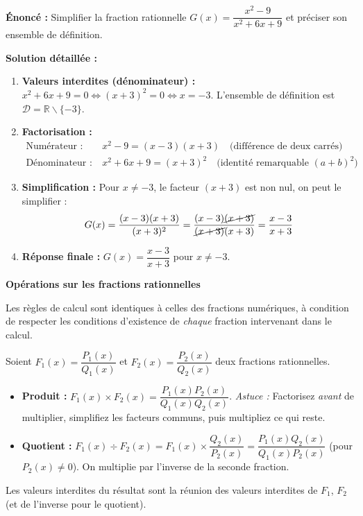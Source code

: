 \documentclass[11pt]{article}
\def\setminus{\mathbin{\backslash}}\let\smallsetminus\setminus
\begin{document}
\begin{exoresolu}
\textbf{Énoncé :} Simplifier la fraction rationnelle $G(x) = \dfrac{x^2 - 9}{x^2 + 6x + 9}$ et préciser son ensemble de définition.

\textbf{Solution détaillée :}
\begin{enumerate}
\item \textbf{Valeurs interdites (dénominateur) :} $x^2 + 6x + 9 = 0 \iff (x+3)^2 = 0 \iff x = -3$.
   L'ensemble de définition est $\mathcal{D} = \mathbb{R} \setminus \{-3\}$.
\item \textbf{Factorisation :}
   \begin{align*}
   \text{Numérateur : } & x^2 - 9 = (x-3)(x+3) \quad \text{(différence de deux carrés)} \\
   \text{Dénominateur : } & x^2 + 6x + 9 = (x+3)^2 \quad \text{(identité remarquable $(a+b)^2$)}
   \end{align*}
\item \textbf{Simplification :} Pour $x \neq -3$, le facteur $(x+3)$ est non nul, on peut le simplifier :
   \[
   G(x) = \frac{(x-3)(x+3)}{(x+3)^2} = \frac{(x-3)\cancel{(x+3)}}{\cancel{(x+3)}(x+3)} = \frac{x-3}{x+3}
   \]
\item \textbf{Réponse finale :} $G(x) = \dfrac{x-3}{x+3}$ pour $x \neq -3$.
\end{enumerate}
\end{exoresolu}

\textbf{Opérations sur les fractions rationnelles}\par

Les règles de calcul sont identiques à celles des fractions numériques, à condition de respecter les conditions d'existence de \emph{chaque} fraction intervenant dans le calcul.

\begin{propriete}
Soient $F_1(x) = \dfrac{P_1(x)}{Q_1(x)}$ et $F_2(x) = \dfrac{P_2(x)}{Q_2(x)}$ deux fractions rationnelles.
\begin{itemize}
\item \textbf{Produit :} $F_1(x) \times F_2(x) = \dfrac{P_1(x)P_2(x)}{Q_1(x)Q_2(x)}$.
   \textit{Astuce :} Factorisez \emph{avant} de multiplier, simplifiez les facteurs communs, puis multipliez ce qui reste.
\item \textbf{Quotient :} $F_1(x) \div F_2(x) = F_1(x) \times \dfrac{Q_2(x)}{P_2(x)} = \dfrac{P_1(x)Q_2(x)}{Q_1(x)P_2(x)}$ (pour $P_2(x) \neq 0$).
   On multiplie par l'inverse de la seconde fraction.
\end{itemize}
Les valeurs interdites du résultat sont la réunion des valeurs interdites de $F_1$, $F_2$ (et de l'inverse pour le quotient).
\end{propriete}
\end{document}
